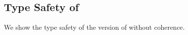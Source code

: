 \subsection{Type Safety of \name}

We show the type safety of the version of \name without coherence.





\lemmasub*

